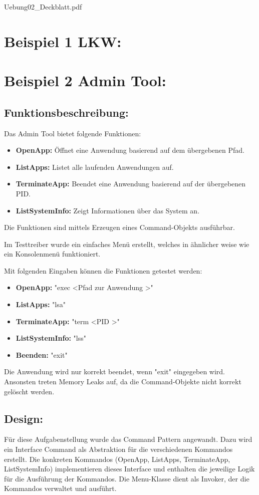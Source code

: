 \documentclass[a4paper,12pt]{article}
\begin{document}
 {Uebung02_Deckblatt.pdf}
\newpage
\section{Beispiel 1 LKW:}

\section{Beispiel 2 Admin Tool:}

\subsection{Funktionsbeschreibung:}
Das Admin Tool bietet folgende Funktionen:
\begin{itemize}
		\item \textbf{OpenApp:} Öffnet eine Anwendung basierend auf dem übergebenen Pfad.
		\item \textbf{ListApps:} Listet alle laufenden Anwendungen auf.
		\item \textbf{TerminateApp:} Beendet eine Anwendung basierend auf der übergebenen PID.
		\item \textbf{ListSystemInfo:} Zeigt Informationen über das System an.
\end{itemize}

Die Funktionen sind mittels Erzeugen eines Command-Objekts ausführbar.

Im Testtreiber wurde ein einfaches Menü erstellt, welches in ähnlicher weise wie ein Konsolenmenü funktioniert.

Mit folgenden Eingaben können die Funktionen getestet werden:
\begin{itemize}
	\item \textbf{OpenApp:} "exec \textless Pfad zur Anwendung \textgreater"
	\item \textbf{ListApps:} "lsa"
	\item \textbf{TerminateApp:} "term \textless PID \textgreater"
	\item \textbf{ListSystemInfo:} "lss"
	\item \textbf{Beenden:} "exit"
\end{itemize}

Die Anwendung wird nur korrekt beendet, wenn "exit" eingegeben wird. 
Ansonsten treten Memory Leaks auf, da die Command-Objekte nicht korrekt gelöscht werden.

\subsection{Design:}
Für diese Aufgabenstellung wurde das Command Pattern angewandt.
Dazu wird ein Interface Command als Abstraktion für die verschiedenen Kommandos erstellt.
Die konkreten Kommandos (OpenApp, ListApps, TerminateApp, ListSystemInfo) implementieren dieses Interface und enthalten die jeweilige Logik für die Ausführung der Kommandos.
Die Menu-Klasse dient als Invoker, der die Kommandos verwaltet und ausführt.\\
\end{document}
